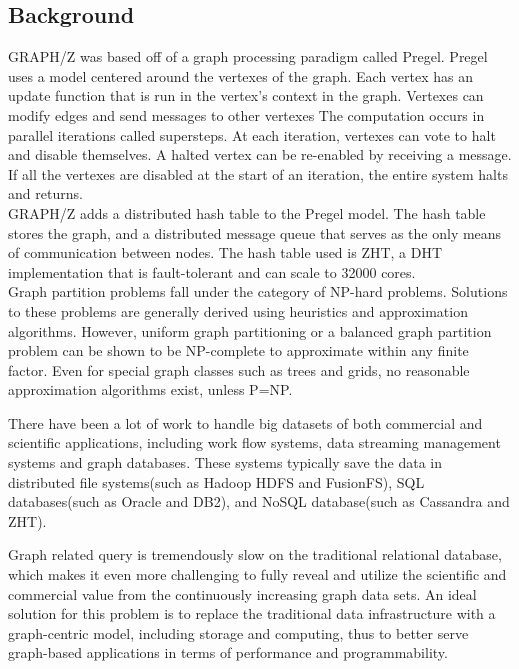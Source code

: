 \documentclass[10pt]{article}
\begin{document}
\begin{multicols}{2} 
  \section{Background}
  GRAPH/Z was based off of a graph processing paradigm called Pregel. Pregel uses a model centered around the vertexes of the graph. \cite{Gz:1}  Each vertex has an update function that is run in the vertex's context in the graph. Vertexes can modify edges and send messages to other vertexes \cite{Gz:1} The computation occurs in parallel iterations called supersteps. \cite{Gz:1} At each iteration, vertexes can vote to halt and disable themselves. A halted vertex can be re-enabled by receiving a message. If all the vertexes are disabled at the start of an iteration, the entire system halts and returns.\\
  GRAPH/Z adds a distributed hash table to the Pregel model. The hash table stores the graph, and a distributed message queue that serves as the only means of communication between nodes. The hash table used is ZHT, a DHT implementation that is fault-tolerant and can scale to 32000 cores. \cite{Gz:2}\\
  Graph partition problems fall under the category of NP-hard problems. Solutions to these problems are generally derived using heuristics and approximation algorithms. However, uniform graph partitioning or a balanced graph partition problem can be shown to be NP-complete to approximate within any finite factor. Even for special graph classes such as trees and grids, no reasonable approximation algorithms exist, unless P=NP.

  There have been a lot of work to handle big datasets of both commercial and scientific applications, including work flow systems, data streaming management systems and graph databases. These systems typically save the data in distributed file systems(such as Hadoop HDFS and FusionFS), SQL databases(such as Oracle and DB2), and NoSQL database(such as Cassandra and ZHT).

  Graph related query is tremendously slow on the traditional relational database, which makes it even more challenging to fully reveal and utilize the scientific and commercial value from the continuously increasing graph data sets. An ideal solution for this problem is to replace the traditional data infrastructure with a graph-centric model, including storage and computing, thus to better serve graph-based applications in terms of performance and programmability.


\end{multicols}
\end{document}
